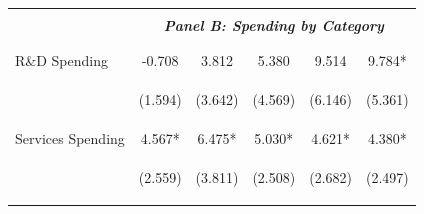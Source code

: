 \documentclass[dv_diss_main.tex]{subfiles}
\begin{document}
\begin{table}[H]
\begin{center}
{\begin{tabular}{lccccc}
    \cmidrule{2-6}
    \vspace{-1.5pt} & \vspace{-1.5pt} & \vspace{-1.5pt} & \vspace{-1.5pt} & \vspace{-1.5pt} \\
    & \multicolumn{5}{c}{\textit{\textbf{Panel B: Spending by Category}}} \\ 
    \vspace{-1.5pt} & \vspace{-1.5pt} & \vspace{-1.5pt} & \vspace{-1.5pt} & \vspace{-1.5pt} \\ 
    \cmidrule{2-6}
    \vspace{-1.5pt} & \vspace{-1.5pt} & \vspace{-1.5pt} & \vspace{-1.5pt} & \vspace{-1.5pt} \\
    R\&D Spending & -0.708 & 3.812 & 5.380 & 9.514 & 9.784* \\
    \vspace{4pt} & \begin{footnotesize}(1.594)\end{footnotesize} & \begin{footnotesize}(3.642)\end{footnotesize} & \begin{footnotesize}(4.569)\end{footnotesize} & \begin{footnotesize}(6.146)\end{footnotesize} & \begin{footnotesize}(5.361)\end{footnotesize} \\
    Services Spending & 4.567* & 6.475* & 5.030* & 4.621* & 4.380* \\
    \vspace{4pt} & \begin{footnotesize}(2.559)\end{footnotesize} & \begin{footnotesize}(3.811)\end{footnotesize} & \begin{footnotesize}(2.508)\end{footnotesize} & \begin{footnotesize}(2.682)\end{footnotesize} & \begin{footnotesize}(2.497)\end{footnotesize} \\

\end{tabular}}
\end{center}
\end{table}
\end{document}
